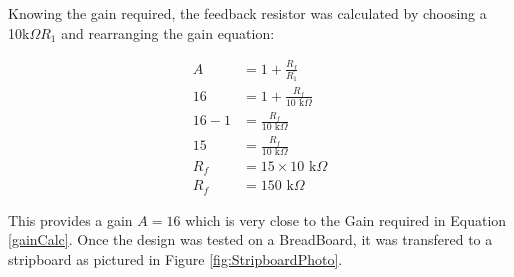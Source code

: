 Knowing the gain required, the feedback resistor was calculated by choosing a 10k$\Omega R_1$ and rearranging the gain equation:

\begin{equation} \label{Feedback Resistor Calculation}
  \begin{split}
  A &= 1 + \frac{R_f}{R_1} \\
  16 &= 1 + \frac{R_f}{10\text{ k}\Omega} \\
  16 - 1 &= \frac{R_f}{10\text{ k}\Omega} \\
  15 &= \frac{R_f}{10\text{ k}\Omega} \\
  R_f &= 15 \times 10\text{ k}\Omega \\
  R_f &= 150\text{ k}\Omega
  \end{split}
\end{equation}

This provides a gain $A= 16$ which is very close to the Gain required in Equation \ref{gainCalc}. Once the design was tested on a BreadBoard, it was transfered to a stripboard as pictured in Figure \ref{fig:StripboardPhoto}.


%
%



%         
